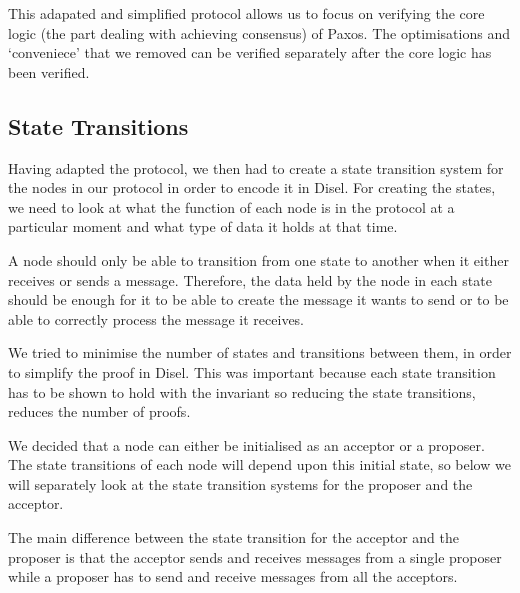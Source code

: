 This adapated and simplified protocol allows us to focus on verifying the core
logic (the part dealing with achieving consensus) of Paxos. The
optimisations and `conveniece' that we removed can be verified separately after
the core logic has been verified.


\subsection{State Transitions}
Having adapted the protocol, we then had to create a state transition system for
the nodes in our protocol in order to encode it in Disel. For creating the states,
we need to look at what the function of each node is in the protocol at a particular
moment and what type of data it holds at that time.

A node should only be able to transition from one state to another when it either
receives or sends a message. Therefore, the data held by the node in each state
should be enough for it to be able to create the message it wants to send or to
be able to correctly process the message it receives.

We tried to minimise the number of states and transitions between them, in order
to simplify the proof in Disel. This was important because each state transition
has to be shown to hold with the invariant so reducing the state transitions,
reduces the number of proofs.

We decided that a node can either be initialised as an acceptor or a proposer.
The state transitions of each node will depend upon this initial state, so below
we will separately look at the state transition systems for the proposer and the
acceptor.

The main difference between the state transition for the acceptor and the proposer
is that the acceptor sends and receives messages from a single proposer while a
proposer has to send and receive messages from all the acceptors.



